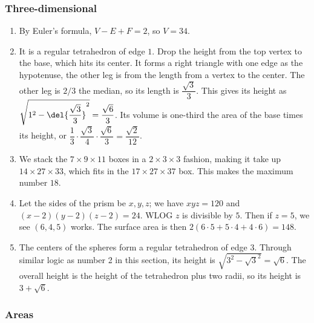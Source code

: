 \documentclass[10pt,paper=letter]{scrartcl}
\begin{document}
\subsubsection*{Three-dimensional}

\begin{enumerate}

\item By Euler's formula, $V - E + F = 2$, so $V = 34$.

\item It is a regular tetrahedron of edge $1$. Drop the height from the top vertex to the base, which hits its center. It forms a right triangle with one edge as the hypotenuse, the other leg is from the length from a vertex to the center. The other leg is $2/3$ the median, so its length is $\dfrac{\sqrt3}3$. This gives its height as $\sqrt{1^2 - \del{\dfrac{\sqrt3}3}^2} = \dfrac{\sqrt6}3$. Its volume is one-third the area of the base times its height, or $\dfrac13\cdot\dfrac{\sqrt3}4\cdot\dfrac{\sqrt6}3 = \dfrac{\sqrt2}{12}$.

\item We stack the $7 \times 9 \times 11$ boxes in a $2 \times 3 \times 3$ fashion, making it take up $14 \times 27 \times 33$, which fits in the $17 \times 27 \times 37$ box. This makes the maximum number $18$.

\item Let the sides of the prism be $x, y, z$; we have $xyz = 120$ and $(x-2)(y-2)(z-2) = 24$. WLOG $z$ is divisible by $5$. Then if $z = 5$, we see $(6, 4, 5)$ works. The surface area is then $2(6\cdot5 + 5\cdot4 + 4\cdot6) = 148$.

\item The centers of the spheres form a regular tetrahedron of edge $3$. Through similar logic as number 2 in this section, its height is $\sqrt{3^2 - \sqrt{3}^2} = \sqrt6$. The overall height is the height of the tetrahedron plus two radii, so its height is $3 + \sqrt6$.

\end{enumerate}

\subsubsection*{Areas}
\end{document}
